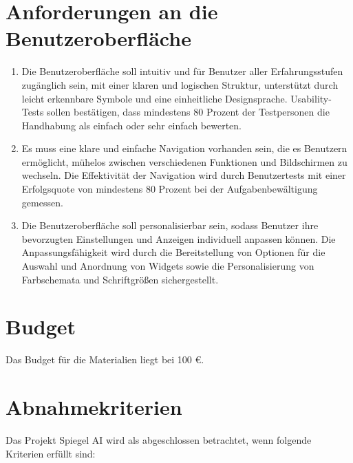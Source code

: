 \documentclass{article}
\begin{document}
\section{Anforderungen an die Benutzeroberfläche}
\begin{enumerate}[label=\textbf{B\arabic*:}]
    \item Die Benutzeroberfläche soll intuitiv und für Benutzer aller Erfahrungsstufen zugänglich sein, mit einer klaren und logischen Struktur, unterstützt durch leicht erkennbare Symbole und eine einheitliche Designsprache. Usability-Tests sollen bestätigen, dass mindestens 80 Prozent der Testpersonen die Handhabung als einfach oder sehr einfach bewerten.
    \item Es muss eine klare und einfache Navigation vorhanden sein, die es Benutzern ermöglicht, mühelos zwischen verschiedenen Funktionen und Bildschirmen zu wechseln. Die Effektivität der Navigation wird durch Benutzertests mit einer Erfolgsquote von mindestens 80 Prozent bei der Aufgabenbewältigung gemessen.
    \item Die Benutzeroberfläche soll personalisierbar sein, sodass Benutzer ihre bevorzugten Einstellungen und Anzeigen individuell anpassen können. Die Anpassungsfähigkeit wird durch die Bereitstellung von Optionen für die Auswahl und Anordnung von Widgets sowie die Personalisierung von Farbschemata und Schriftgrößen sichergestellt.
\end{enumerate}

\section{Budget}
Das Budget für die Materialien liegt bei 100 €.

\section{Abnahmekriterien}
Das Projekt Spiegel AI wird als abgeschlossen betrachtet, wenn folgende Kriterien erfüllt sind:
\end{document}
